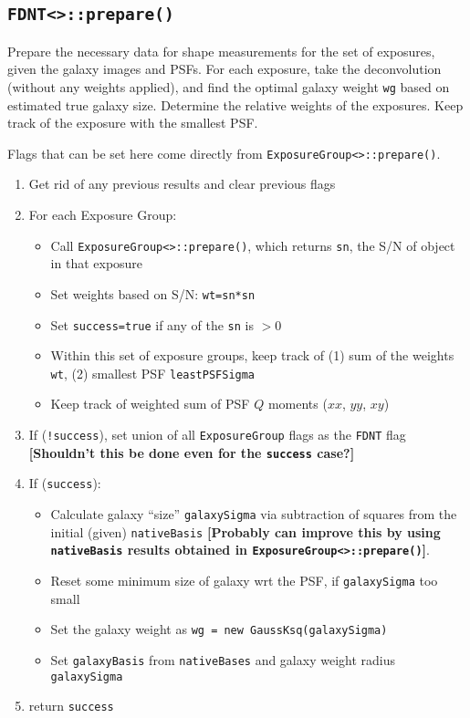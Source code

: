\documentclass[useAMS,usenatbib,usegraphicx]{mn2e}
\begin{document}
\subsection{\texttt{FDNT<>::prepare()}}
Prepare the necessary data for shape measurements for the set of exposures, given the 
galaxy images and PSFs.  For each exposure, take the deconvolution (without any weights applied),
and find the optimal galaxy weight {\tt wg} based on estimated true galaxy size.  
Determine the relative weights of the exposures.  Keep track of the exposure with the smallest PSF.

Flags that can be set here come directly from {\tt ExposureGroup<>::prepare()}.
\begin{enumerate}
\item Get rid of any previous results and clear previous flags
\item For each Exposure Group:
\begin{itemize}
  \item Call \texttt{ExposureGroup<>::prepare()}, which returns {\tt sn}, the S/N of object in that exposure
  \item Set weights based on S/N: {\tt wt=sn*sn}
  \item Set {\tt success=true} if any of the {\tt sn} is $>0$
  \item Within this set of exposure groups, keep track of (1) sum of the weights {\tt wt}, (2) smallest PSF {\tt leastPSFSigma}
  \item Keep track of weighted sum of PSF $Q$ moments ($xx$, $yy$, $xy$)
\end{itemize}
\item If ({\tt !success}), set union of all {\tt ExposureGroup} flags as the {\tt FDNT} flag
{\bf [Shouldn't this be done even for the {\tt success} case?]}
\item If ({\tt success}):
\begin{itemize}
  \item Calculate galaxy ``size'' {\tt galaxySigma} via subtraction of squares from the initial 
(given) {\tt nativeBasis} {\bf [Probably can improve this by using {\tt nativeBasis} results 
obtained in {\tt ExposureGroup<>::prepare()}]}.  
  \item Reset some minimum size of galaxy wrt the PSF, if {\tt galaxySigma} too small
  \item Set the galaxy weight as {\tt wg = new GaussKsq(galaxySigma)}
  \item Set {\tt galaxyBasis} from {\tt nativeBases} and galaxy weight radius {\tt galaxySigma}
\end{itemize}
\item return {\tt success}
\end{enumerate}
\end{document}
